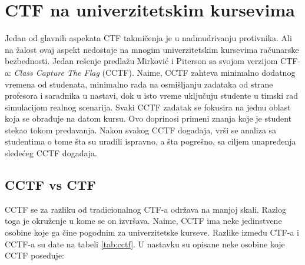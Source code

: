 \documentclass[12pt, a4paper, twocolumn]{article}
\begin{document}
\section{CTF na univerzitetskim kursevima}

Jedan od glavnih aspekata CTF takmičenja je u nadmudrivanju protivnika. Ali na
žalost ovaj aspekt nedostaje na mnogim univerzitetskim kursevima računarske
bezbednosti. Jedan rešenje predlažu Mirković i Piterson \cite{ctf_class} sa
svojom verzijom CTF-a: \emph{Class Capture The Flag} (CCTF). Naime, CCTF
zahteva minimalno dodatnog vremena od studenata, minimalno rada na 
osmišljanju zadataka od strane profesora i saradnika u nastavi, dok u isto
vreme uključuju studente u timski rad simulacijom realnog scenarija.
Svaki CCTF zadatak se fokusira na jednu oblast koja se obrađuje na datom 
kursu. Ovo doprinosi primeni znanja koje je student stekao tokom predavanja.
Nakon svakog CCTF događaja, vrši se analiza sa studentima o tome šta su
uradili ispravno, a šta pogrešno, sa ciljem unapređenja sledećeg CCTF 
događaja. 

\subsection{CCTF vs CTF}

CCTF se za razliku od tradicionalnog CTF-a održava na manjoj skali. Razlog 
toga je okruženje u kome se on izvršava. Naime, CCTF ima neke jedinstvene
osobine koje ga čine pogodnim za univerzitetske kurseve. Razlike između
CTF-a i CCTF-a su date na tabeli \ref{tab:cctf}. U nastavku su opisane neke 
osobine koje CCTF poseduje:

\begin{table}[!h]
    \centering
    \caption{Upoređivanje CTF-a i CCTF-a.}\label{tab:cctf}
\end{table}
\end{document}
